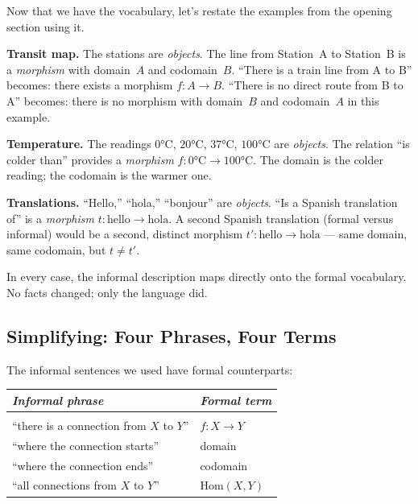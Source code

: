 Now that we have the vocabulary, let's restate the examples from the
opening section using it.

\textbf{Transit map.} The stations are \emph{objects}. The line from Station~A
to Station~B is a \emph{morphism} with domain~$A$ and codomain~$B$. ``There
is a train line from A to B'' becomes: there exists a morphism $f : A \to B$.
``There is no direct route from B to A'' becomes: there is no morphism with
domain~$B$ and codomain~$A$ in this example.

\textbf{Temperature.} The readings $0°\text{C}$, $20°\text{C}$,
$37°\text{C}$, $100°\text{C}$ are \emph{objects}. The relation ``is colder
than'' provides a \emph{morphism} $f : 0°\text{C} \to 100°\text{C}$. The
domain is the colder reading; the codomain is the warmer one.

\textbf{Translations.} ``Hello,'' ``hola,'' ``bonjour'' are \emph{objects}.
``Is a Spanish translation of'' is a \emph{morphism} $t : \text{hello} \to
\text{hola}$. A second Spanish translation (formal versus informal) would be
a second, distinct morphism $t' : \text{hello} \to \text{hola}$ --- same
domain, same codomain, but $t \neq t'$.

In every case, the informal description maps directly onto the formal
vocabulary. No facts changed; only the language did.

\subsection{Simplifying: Four Phrases, Four Terms}

The informal sentences we used have formal counterparts:

\medskip
\begin{center}
\begin{tabular}{ll}
  \textit{Informal phrase} & \textit{Formal term} \\[4pt]
  \hline\\[-6pt]
  ``there is a connection from $X$ to $Y$'' & $f : X \to Y$ \\
  ``where the connection starts'' & domain \\
  ``where the connection ends'' & codomain \\
  ``all connections from $X$ to $Y$'' & $\mathrm{Hom}(X, Y)$ \\
\end{tabular}
\end{center}
\medskip


